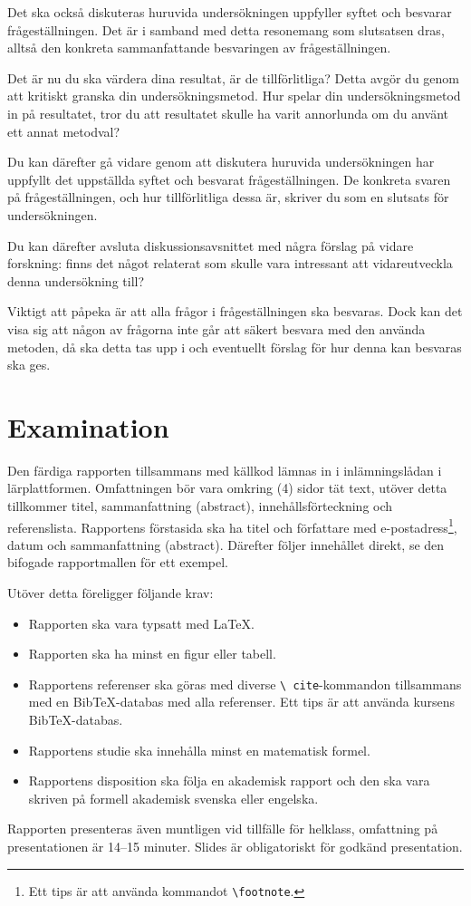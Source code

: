 \documentclass[a4paper]{miunasgn}
\begin{document}
Det ska också diskuteras huruvida undersökningen uppfyller syftet och besvarar 
frågeställningen.
Det är i samband med detta resonemang som slutsatsen dras, alltså den konkreta 
sammanfattande besvaringen av frågeställningen.

Det är nu du ska värdera dina resultat, är de tillförlitliga?
Detta avgör du genom att kritiskt granska din undersökningsmetod.
Hur spelar din undersökningsmetod in på resultatet, tror du att resultatet 
skulle ha varit annorlunda om du använt ett annat metodval?

Du kan därefter gå vidare genom att diskutera huruvida undersökningen har 
uppfyllt det uppställda syftet och besvarat frågeställningen.
De konkreta svaren på frågeställningen, och hur tillförlitliga dessa är, 
skriver du som en slutsats för undersökningen.

Du kan därefter avsluta diskussionsavsnittet med några förslag på vidare 
forskning: finns det något relaterat som skulle vara intressant att 
vidareutveckla denna undersökning till?

Viktigt att påpeka är att alla frågor i frågeställningen ska besvaras.
Dock kan det visa sig att någon av frågorna inte går att säkert besvara med den 
använda metoden, då ska detta tas upp i och eventuellt förslag för hur denna 
kan besvaras ska ges.


\section{Examination}

Den färdiga rapporten tillsammans med källkod lämnas in i inlämningslådan 
i lärplattformen.
Omfattningen bör vara omkring (4) sidor tät text, utöver detta tillkommer 
titel, sammanfattning (abstract), innehållsförteckning och referenslista.
Rapportens förstasida ska ha titel och författare med e-postadress\footnote{%
  Ett tips är att använda kommandot \texttt{\textbackslash footnote}.
}, datum och sammanfattning (abstract).
Därefter följer innehållet direkt, se den bifogade rapportmallen för ett 
exempel.

Utöver detta föreligger följande krav:
\begin{itemize}
  \item Rapporten ska vara typsatt med LaTeX.
  \item Rapporten ska ha minst en figur eller tabell.
  \item Rapportens referenser ska göras med diverse \texttt{\textbackslash 
    cite}-kommandon tillsammans med en BibTeX-databas med alla referenser.
    Ett tips är att använda kursens BibTeX-databas.
  \item Rapportens studie ska innehålla minst en matematisk formel.
  \item Rapportens disposition ska följa en akademisk rapport och den ska vara 
    skriven på formell akademisk svenska eller engelska.
\end{itemize}

Rapporten presenteras även muntligen vid tillfälle för helklass, omfattning på 
presentationen är 14--15 minuter.
Slides är obligatoriskt för godkänd presentation.


\printbibliography
\end{document}
